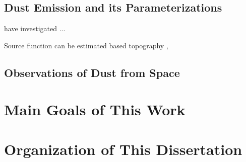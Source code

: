\subsection{Dust Emission and its Parameterizations}

\citet{koven08} have investigated ...

Source function can be estimated based topography \citep{ginoux01}, 

\subsection{Observations of Dust from Space}

\section{Main Goals of This Work}

\section{Organization of This Dissertation}
